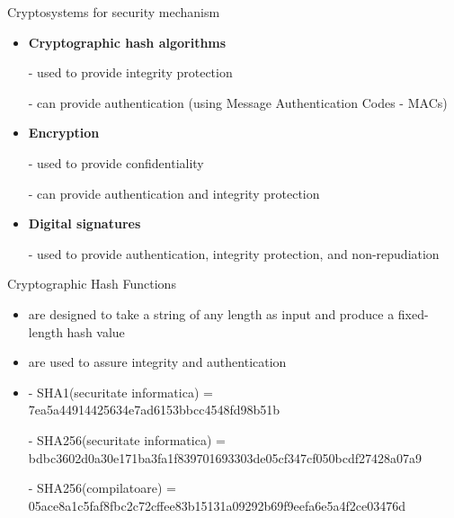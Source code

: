 \documentclass[pdf]{beamer}
\begin{document}
\begin{frame}{Cryptosystems for security mechanism}
\begin{itemize}
\item
\textbf{Cryptographic hash algorithms}

- used to provide integrity protection

- can provide authentication (using Message Authentication Codes - MACs)

\item
\textbf{Encryption}

- used to provide confidentiality

- can provide authentication and integrity protection

\item
\textbf{Digital signatures} 

- used to provide authentication, integrity protection, and non-repudiation

\end{itemize}
\end{frame}



\begin{frame}{Cryptographic Hash Functions}
\begin{itemize}
\item
are designed to take a string of any length as input and produce a fixed-length hash value

\item
are used to assure integrity and authentication

\item

- SHA1(securitate informatica) = 7ea5a44914425634e7ad6153bbcc4548fd98b51b

- SHA256(securitate informatica) = bdbc3602d0a30e171ba3fa1f839701693303de05cf347cf050bcdf27428a07a9

- SHA256(compilatoare) = 
05ace8a1c5faf8fbc2c72cffee83b15131a09292b69f9eefa6e5a4f2ce03476d

\end{itemize}
\end{frame}
\end{document}

